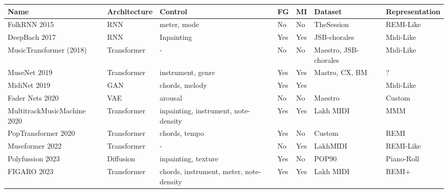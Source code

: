 \begin{table}[H] 
    \centering
    \renewcommand{\arraystretch}{1.2} %
    \setlength{\tabcolsep}{3pt} %
    \scriptsize %
    \begin{tabular}{|p{2.5cm}|p{1.8cm}|p{3cm}|p{1cm}|p{1cm}|p{3cm}|p{2.5cm}|}
        \hline
        \textbf{Name} & \textbf{Architecture} & \textbf{Control} & \textbf{FG} & \textbf{MI} & \textbf{Dataset} & \textbf{Representation} \\
        \hline
        FolkRNN 2015 \cite{Sturm_Ben-Tal_2016} & RNN & meter, mode & No & No & TheSession\cite{sessionfolkdata} & REMI-Like\\
        DeepBach 2017 \cite{Hadjeres_Pachet_Nielsen_2017} & RNN & Inpainting & Yes & Yes & JSB-chorales\cite{jsbchorales} & Midi-Like\\ 
        MusicTransformer (2018) \cite{Huang_Vaswani_Uszkoreit_Shazeer_Simon_Hawthorne_Dai_Hoffman_Dinculescu_Eck_2018} & Transformer & - & No & No & Maestro\cite{hawthorne2018maestro},  JSB-chorales\cite{jsbchorales} & Midi-Like\\
        MuseNet 2019 \cite{Christine_2019} & Transformer & instrument, genre & Yes & Yes & Mastro\cite{hawthorne2018maestro}, CX\cite{classicalarchives}, BM\cite{bitmidi} & ?\\
        MidiNet 2019 \cite{midinet} & GAN & chords, melody & Yes & Yes & \cite{hooktheorypopmidi} & Midi-Like\\
        Fader Nets 2020\cite{Tan_Herremans_2020} & VAE & arousal & No & No & Maestro \cite{hawthorne2018maestro} & Custom \\
        MultitrackMusicMachine 2020 \cite{Ens_Pasquier_2020_MMM} & Transformer & inpainting, instrument, note-density & Yes & Yes & Lakh MIDI\cite{Raffel_2016} & MMM\\
        PopTransformer 2020 \cite{Huang_Yang_remi_pop_transformer_2020} & Transformer & chords, tempo & Yes & No & Custom & REMI\\
        Museformer 2022 \cite{Yu_Lu_Wang_Hu_Tan_Ye_Zhang_museformer_2022} & Transformer & - & No & Yes & LakhMIDI \cite{Raffel_2016} & REMI-Like\\
        Polyfussion 2023 \cite{Min_Jiang_Xia_Zhao_polyffusion_2023} & Diffusion & inpainting, texture & Yes & No & POP90 \cite{Wang_Chen_pop90_dataset} & Piano-Roll\\
        FIGARO 2023 \cite{Rütte_figaro_2023} & Transformer & chords, instrument, meter, note-density & Yes & Yes & Lakh MIDI\cite{Raffel_2016} & REMI+ \\

\end{tabular}
\end{table}

